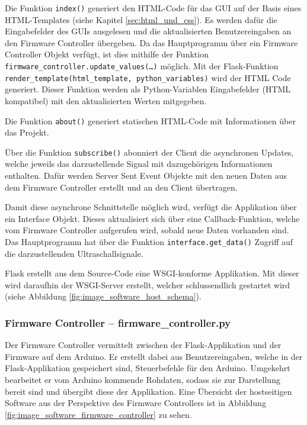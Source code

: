 Die Funktion \texttt{index()} generiert den HTML-Code für das GUI auf der Basis eines HTML-Templates (siehe Kapitel \ref{sec:html_und_css}). Es werden dafür die Eingabefelder des GUIs ausgelesen und die aktualisierten Benutzereingaben an den Firmware Controller übergeben. Da das Hauptprogramm über ein Firmware Controller Objekt verfügt, ist dies mithilfe der Funktion \texttt{firm\-ware\_con\-troller.update\_values(\dots)} möglich. Mit der Flask-Funktion \texttt{ren\-der\_temp\-late(html\-\_temp\-late, python\_variables)} wird der HTML Code generiert. Dieser Funktion werden als Python-Variablen Eingabefelder (HTML kompatibel) mit den aktualisierten Werten mitgegeben.

Die Funktion \texttt{about()} generiert statischen HTML-Code mit Informationen über das Projekt.

Über die Funktion \texttt{subscribe()} abonniert der Client die asynchronen Updates, welche jeweils das darzustellende Signal mit dazugehörigen Informationen enthalten. Dafür werden Server Sent Event Objekte mit den neuen Daten aus dem Firmware Controller erstellt und an den Client übertragen.

Damit diese asynchrone Schnittstelle möglich wird, verfügt die Applikation über ein Interface Objekt. Dieses aktualisiert sich über eine Callback-Funktion, welche vom Firmware Controller aufgerufen wird, sobald neue Daten vorhanden sind. Das Hauptprogramm hat über die Funktion \texttt{interface.get\_data()} Zugriff auf die darzustellenden Ultraschallsignale.

Flask erstellt aus dem Source-Code eine WSGI-konforme Applikation. Mit dieser wird daraufhin der WSGI-Server erstellt, welcher schlussendlich gestartet wird (siehe Abbildung \ref{fig:image_software_host_schema}).


\subsubsection{Firmware Controller -- firmware\_controller.py}\label{sec:firmware_controller}
Der Firmware Controller vermittelt zwischen der Flask-Applikation und der Firmware auf dem Arduino. Er erstellt dabei aus Benutzereingaben, welche in der Flask-Applikation gespeichert sind, Steuerbefehle für den Arduino. Umgekehrt bearbeitet er vom Arduino kommende Rohdaten, sodass sie zur Darstellung bereit sind und übergibt diese der Applikation. Eine Übersicht der hostseitigen Software aus der Perspektive des Firmware Controllers ist in Abbildung \ref{fig:image_software_firmware_controller} zu sehen.

